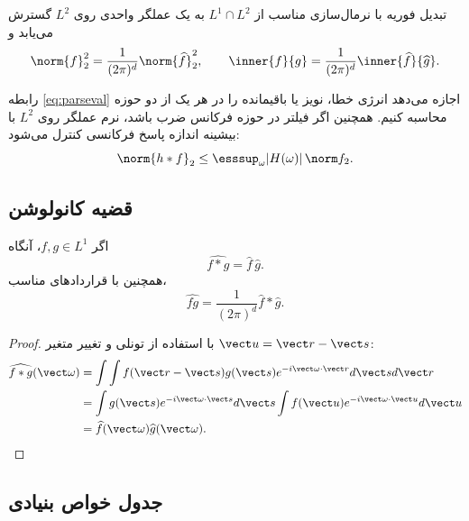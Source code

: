 \begin{theorem}
تبدیل فوریه با نرمال‌سازی مناسب از \(L^1\cap L^2\) به یک عملگر واحدی روی \(L^2\) گسترش می‌یابد و
\begin{equation}
\norm{f}_2^2=\frac{1}{(2\pi)^d}\norm{\widehat f}_2^2,
\qquad
\inner{f}{g}=\frac{1}{(2\pi)^d}\inner{\widehat f}{\widehat g}.
\label{eq:parseval}
\end{equation}
\end{theorem}

\begin{proofbox}
رابطه \eqref{eq:parseval} اجازه می‌دهد انرژی خطا، نویز یا باقیمانده را در هر یک از دو حوزه محاسبه کنیم.
همچنین اگر فیلتر در حوزه فرکانس ضرب باشد، نرم عملگر روی \(L^2\) با بیشینه اندازه پاسخ فرکانسی کنترل می‌شود:
\begin{equation}
\norm{h*f}_2\le \esssup_{\omega}|H(\omega)|\,\norm f_2.
\end{equation}
\end{proofbox}

\subsection{قضیه کانولوشن}

\begin{theorem}
اگر \(f,g\in L^1\)، آنگاه
\begin{equation}
\widehat{f*g}=\widehat f\,\widehat g.
\label{eq:conv-theorem}
\end{equation}
همچنین با قراردادهای مناسب،
\begin{equation}
\widehat{fg}=\frac{1}{(2\pi)^d}\widehat f*\widehat g.
\end{equation}
\end{theorem}

\begin{proof}
با استفاده از تونلی و تغییر متغیر \(\vect u=\vect r-\vect s\):
\begin{align}
\widehat{f*g}(\vect\omega)
&=\int\int f(\vect r-\vect s)g(\vect s)e^{-i\vect\omega\cdot\vect r}
 d\vect s d\vect r\\
&=\int g(\vect s)e^{-i\vect\omega\cdot\vect s}d\vect s
\int f(\vect u)e^{-i\vect\omega\cdot\vect u}d\vect u\\
&=\widehat f(\vect\omega)\widehat g(\vect\omega).
\end{align}
\end{proof}

\subsection{جدول خواص بنیادی}

